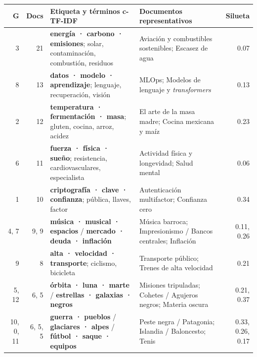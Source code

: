 \documentclass[10pt,a4paper]{article}
\begin{document}
\begin{table}[H]
\centering\footnotesize\setlength{\tabcolsep}{4pt}
\begin{tabular}{@{}rr>{\raggedright\arraybackslash}p{6.0cm}>{\raggedright\arraybackslash}p{5.5cm}r@{}}
\toprule
\textbf{G} & \textbf{Docs} & \textbf{Etiqueta y términos c-TF-IDF} & \textbf{Documentos representativos} & \textbf{Silueta} \\
\midrule
3  & 21 & \textbf{energía · carbono · emisiones}; solar, contaminación, combustión, residuos & Aviación y combustibles sostenibles; Escasez de agua & 0.07 \\
8  & 13 & \textbf{datos · modelo · aprendizaje}; lenguaje, recuperación, visión & MLOps; Modelos de lenguaje y \emph{transformers} & 0.13 \\
2  & 12 & \textbf{temperatura · fermentación · masa}; gluten, cocina, arroz, acidez & El arte de la masa madre; Cocina mexicana y maíz & 0.23 \\
6  & 11 & \textbf{fuerza · física · sueño}; resistencia, cardiovasculares, especialista & Actividad física y longevidad; Salud mental & 0.06 \\
1  & 10 & \textbf{criptografía · clave · confianza}; pública, llaves, factor & Autenticación multifactor; Confianza cero & 0.34 \\
4, 7 & 9, 9 & \textbf{música · musical · espacios} / \textbf{mercado · deuda · inflación} & Música barroca; Impresionismo / Bancos centrales; Inflación & 0.11, 0.26 \\
9  & 8 & \textbf{alta · velocidad · transporte}; ciclismo, bicicleta & Transporte público; Trenes de alta velocidad & 0.21 \\
5, 12 & 6, 5 & \textbf{órbita · luna · marte} / \textbf{estrellas · galaxias · negros} & Misiones tripuladas; Cohetes / Agujeros negros; Materia oscura & 0.21, 0.37 \\
10, 0, 11 & 6, 5, 5 & \textbf{guerra · pueblos} / \textbf{glaciares · alpes} / \textbf{fútbol · saque · equipos} & Peste negra / Patagonia; Islandia / Baloncesto; Tenis & 0.33, 0.26, 0.17 \\
\bottomrule
\end{tabular}
\end{table}
\end{document}
